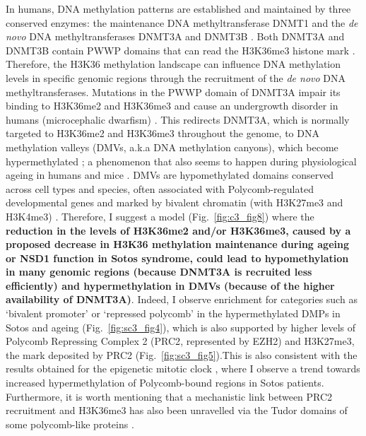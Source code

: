 In humans, DNA methylation patterns are established and maintained by three conserved enzymes: the maintenance DNA methyltransferase DNMT1 and the \textit{de novo} DNA methyltransferases DNMT3A and DNMT3B \cite{Schubeler2015}. Both DNMT3A and DNMT3B contain PWWP domains that can read the H3K36me3 histone mark \cite{Dhayalan2010,Baubec2015}. Therefore, the H3K36 methylation landscape can influence DNA methylation levels in specific genomic regions through the recruitment of the \textit{de novo} DNA methyltransferases. Mutations in the PWWP domain of DNMT3A impair its binding to H3K36me2 and H3K36me3 and cause an undergrowth disorder in humans (microcephalic dwarfism) \cite{Heyn2019}. This redirects DNMT3A, which is normally targeted to H3K36me2 and H3K36me3 throughout the genome, to DNA methylation valleys (\acrshort{DMV}s, a.k.a DNA methylation canyons), which become hypermethylated \cite{Heyn2019}; a phenomenon that also seems to happen during physiological ageing in humans \cite{Slieker2016,Rakyan2010,Teschendorff2010} and mice \cite{Cole2017}. DMVs are hypomethylated domains conserved across cell types and species, often associated with Polycomb-regulated developmental genes and marked by bivalent chromatin (with \acrshort{H3K27me3} and \acrshort{H3K4me3}) \cite{Xie2013,Long2013,Jeong2013,Li2018}. Therefore, I suggest a model (Fig.~\ref{fig:c3_fig8}) where the \textbf{reduction in the levels of H3K36me2 and/or H3K36me3, caused by a proposed decrease in H3K36 methylation maintenance during ageing or NSD1 function in Sotos syndrome, could lead to hypomethylation in many genomic regions (because DNMT3A is recruited less efficiently) and hypermethylation in DMVs (because of the higher availability of DNMT3A)}. Indeed, I observe enrichment for categories such as `bivalent promoter' or `repressed polycomb' in the hypermethylated DMPs in Sotos and ageing (Fig.~\ref{fig:sc3_fig4}), which is also supported by higher levels of Polycomb Repressing Complex 2 (\acrshort{PRC2}, represented by EZH2) and H3K27me3, the mark deposited by PRC2 (Fig.~\ref{fig:sc3_fig5}).This is also consistent with the results obtained for the epigenetic mitotic clock \cite{Yang2016}, where I observe a trend towards increased hypermethylation of Polycomb-bound regions in Sotos patients. Furthermore, it is worth mentioning that a mechanistic link between PRC2 recruitment and H3K36me3 has also been unravelled via the Tudor domains of some polycomb-like proteins \cite{Cai2013,Li2017}.

